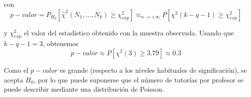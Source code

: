 \documentclass[12pt]{article}
\begin{document}
\begin{ejercicio}
\begin{enumerate}
            con $$p-valor = P_{H_0}[\hat{\chi}^2(N_1, \ldots, N_k) \geqslant \chi^2_{exp}] \approx_{n \to +\infty} P[\chi^2(k-q-1) \geqslant \chi^2_{exp}]$$

            y $\chi^2_{exp}$ el valor del estadístico obtenido con la muestra observada. Usando que $k-q-1=3$, obtenemos
            $$p-valor \approx P[\chi^2(3) \geqslant 3.79] \approx 0.3$$

            Como el $p-valor$ es grande (respecto a los niveles habituales de significación), se acepta $H_0$, por lo que 
            puede suponerse que el número de tutorías por profesor se puede describir mediante una distribución de Poisson.
        \end{enumerate}
    \end{ejercicio}
\end{document}
